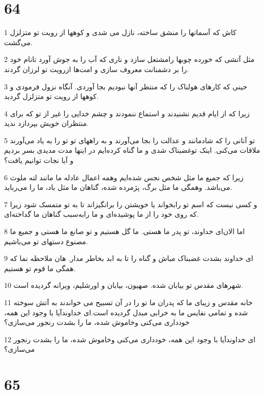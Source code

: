 \chapter{64}

\par 1 کاش که آسمانها را منشق ساخته، نازل می شدی و کوهها از رویت تو متزلزل می‌گشت.
\par 2 مثل آتشی که خورده چوبها رامشتعل سازد و ناری که آب را به جوش آورد تانام خود را بر دشمنانت معروف سازی و امت‌ها ازرویت تو لرزان گردند.
\par 3 حینی که کارهای هولناک را که منتظر آنها نبودیم بجا آوردی. آنگاه نزول فرمودی و کوهها از رویت تو متزلزل گردید.
\par 4 زیرا که از ایام قدیم نشنیدند و استماع ننمودند و چشم خدایی را غیر از تو که برای منتظران خویش بپردازد ندید.
\par 5 تو آنانی را که شادمانند و عدالت را بجا می‌آورند و به راههای تو تو را به یاد می‌آورند ملاقات می‌کنی. اینک توغضبناک شدی و ما گناه کرده‌ایم در اینها مدت مدیدی بسر بردیم و آیا نجات توانیم یافت؟
\par 6 زیرا که جمیع ما مثل شخص نجس شده‌ایم وهمه اعمال عادله ما مانند لته ملوث می‌باشد. وهمگی ما مثل برگ، پژمرده شده، گناهان ما مثل باد، ما را می‌رباید.
\par 7 و کسی نیست که اسم تو رابخواند یا خویشتن را برانگیزاند تا به تو متمسک شود زیرا که روی خود را از ما پوشیده‌ای و ما رابه‌سبب گناهان ما گداخته‌ای.
\par 8 اما الان‌ای خداوند، تو پدر ما هستی. ما گل هستیم و تو صانع ما هستی و جمیع ما مصنوع دستهای تو می‌باشیم.
\par 9 ‌ای خداوند بشدت غضبناک مباش و گناه را تا به ابد بخاطر مدار. هان ملاحظه نما که همگی ما قوم تو هستیم.
\par 10 شهرهای مقدس تو بیابان شده. صهیون، بیابان و اورشلیم، ویرانه گردیده است.
\par 11 خانه مقدس و زیبای ما که پدران ما تو را در آن تسبیح می خواندند به آتش سوخته شده و تمامی نفایس ما به خرابی مبدل گردیده است.‌ای خداوندآیا با وجود این همه، خودداری می‌کنی وخاموش شده، ما را بشدت رنجور می‌سازی؟
\par 12 ‌ای خداوندآیا با وجود این همه، خودداری می‌کنی وخاموش شده، ما را بشدت رنجور می‌سازی؟
 
\chapter{65}

